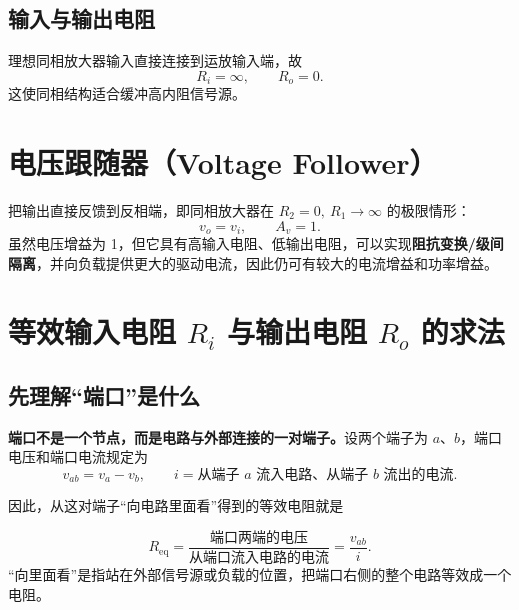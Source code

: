 \documentclass[11pt,fontset=none]{ctexart}
\newcommand{\vo}{v_o}
\newcommand{\vi}{v_i}
\begin{document}
\subsection{输入与输出电阻}

理想同相放大器输入直接连接到运放输入端，故
\[
  \boxed{R_i=\infty,\qquad R_o=0}.
\]
这使同相结构适合缓冲高内阻信号源。

\section{电压跟随器（Voltage Follower）}

把输出直接反馈到反相端，即同相放大器在 $R_2=0,\ R_1\to\infty$ 的极限情形：
\[
  \boxed{\vo=\vi,\qquad A_v=1}.
\]
虽然电压增益为 1，但它具有高输入电阻、低输出电阻，可以实现\textbf{阻抗变换/级间隔离}，并向负载提供更大的驱动电流，因此仍可有较大的电流增益和功率增益。

\section{等效输入电阻 \texorpdfstring{$R_i$}{Ri} 与输出电阻 \texorpdfstring{$R_o$}{Ro} 的求法}

\subsection{先理解“端口”是什么}

\textbf{端口不是一个节点，而是电路与外部连接的一对端子。}设两个端子为 $a$、$b$，端口电压和端口电流规定为
\[
  v_{ab}=v_a-v_b,
  \qquad
  i=\text{从端子 }a\text{ 流入电路、从端子 }b\text{ 流出的电流}.
\]

\begin{center}
\end{center}

因此，从这对端子“向电路里面看”得到的等效电阻就是
\begin{keybox}
\[
  \boxed{R_{\mathrm{eq}}=\frac{\text{端口两端的电压}}{\text{从端口流入电路的电流}}
  =\frac{v_{ab}}{i}}.
\]
“向里面看”是指站在外部信号源或负载的位置，把端口右侧的整个电路等效成一个电阻。
\end{keybox}
\end{document}
